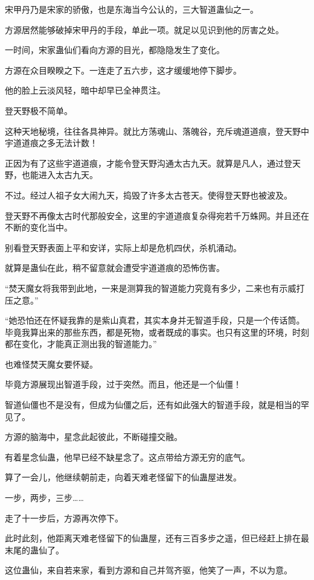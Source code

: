 \begin{this_body}
宋甲丹乃是宋家的骄傲，也是东海当今公认的，三大智道蛊仙之一。

方源居然能够破掉宋甲丹的手段，单此一项。就足以见识到他的厉害之处。

一时间，宋家蛊仙们看向方源的目光，都隐隐发生了变化。

方源在众目睽睽之下。一连走了五六步，这才缓缓地停下脚步。

他的脸上云淡风轻，暗中却早已全神贯注。

登天野极不简单。

这种天地秘境，往往各具神异。就比方荡魂山、落魄谷，充斥魂道道痕，登天野中宇道道痕之多无法计数！

正因为有了这些宇道道痕，才能令登天野沟通太古九天。就算是凡人，通过登天野，也能进入太古九天。

不过。经过人祖子女大闹九天，捣毁了许多太古苍天。使得登天野也被波及。

登天野不再像太古时代那般安全，这里的宇道道痕复杂得宛若千万蛛网。并且还在不断的变化当中。

别看登天野表面上平和安详，实际上却是危机四伏，杀机涌动。

就算是蛊仙在此，稍不留意就会遭受宇道道痕的恐怖伤害。

“焚天魔女将我带到此地，一来是测算我的智道能力究竟有多少，二来也有示威打压之意。”

“她恐怕还在怀疑我靠的是紫山真君，其实本身并无智道手段，只是一个传话筒。毕竟我算出来的那些东西，都是死物，或者既成的事实。也只有这里的环境，时刻都在变化，才能真正测出我的智道能力。”

也难怪焚天魔女要怀疑。

毕竟方源展现出智道手段，过于突然。而且，他还是一个仙僵！

智道仙僵也不是没有，但成为仙僵之后，还有如此强大的智道手段，就是相当的罕见了。

方源的脑海中，星念此起彼此，不断碰撞交融。

有着星念仙蛊，他早已经不缺星念了。这点带给方源无穷的底气。

算了一会儿，他继续朝前走，向着天难老怪留下的仙蛊屋进发。

一步，两步，三步……

走了十一步后，方源再次停下。

此时此刻，他距离天难老怪留下的仙蛊屋，还有三百多步之遥，但已经赶上排在最末尾的蛊仙了。

这位蛊仙，来自若来家，看到方源和自己并驾齐驱，他笑了一声，不以为意。


\end{this_body}
